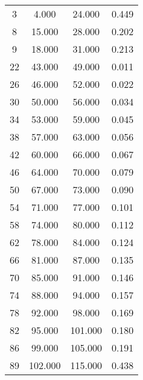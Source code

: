 % 
\begin{tabular}{cccc}
  \hline
  \hline
3 & 4.000 & 24.000 & 0.449 \\ 
  8 & 15.000 & 28.000 & 0.202 \\ 
  9 & 18.000 & 31.000 & 0.213 \\ 
  22 & 43.000 & 49.000 & 0.011 \\ 
  26 & 46.000 & 52.000 & 0.022 \\ 
  30 & 50.000 & 56.000 & 0.034 \\ 
  34 & 53.000 & 59.000 & 0.045 \\ 
  38 & 57.000 & 63.000 & 0.056 \\ 
  42 & 60.000 & 66.000 & 0.067 \\ 
  46 & 64.000 & 70.000 & 0.079 \\ 
  50 & 67.000 & 73.000 & 0.090 \\ 
  54 & 71.000 & 77.000 & 0.101 \\ 
  58 & 74.000 & 80.000 & 0.112 \\ 
  62 & 78.000 & 84.000 & 0.124 \\ 
  66 & 81.000 & 87.000 & 0.135 \\ 
  70 & 85.000 & 91.000 & 0.146 \\ 
  74 & 88.000 & 94.000 & 0.157 \\ 
  78 & 92.000 & 98.000 & 0.169 \\ 
  82 & 95.000 & 101.000 & 0.180 \\ 
  86 & 99.000 & 105.000 & 0.191 \\ 
  89 & 102.000 & 115.000 & 0.438 \\ 
   \hline
\end{tabular}
